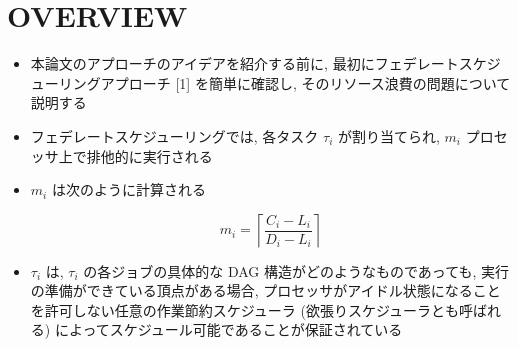 
\section{OVERVIEW}
\label{sec: overview}

\begin{frame}{}
    \begin{itemize}
        \item 本論文のアプローチのアイデアを紹介する前に, 最初にフェデレートスケジューリングアプローチ [1] を簡単に確認し, そのリソース浪費の問題について説明する
\item フェデレートスケジューリングでは, 各タスク $\tau_{i}$ が割り当てられ, $m_{i}$ プロセッサ上で排他的に実行される
\item $m_{i}$ は次のように計算される

              \begin{equation*}
                  m_{i}=\left\lceil\frac{C_{i}-L_{i}}{D_{i}-L_{i}}\right\rceil
              \end{equation*}
    \end{itemize}
\end{frame}

\begin{frame}{}
    \begin{itemize}
        \item  $\tau_{i}$ は, $\tau_{i}$ の各ジョブの具体的な DAG 構造がどのようなものであっても, 実行の準備ができている頂点がある場合, プロセッサがアイドル状態になることを許可しない任意の作業節約スケジューラ (欲張りスケジューラとも呼ばれる) によってスケジュール可能であることが保証されている
    \end{itemize}
\end{frame}

